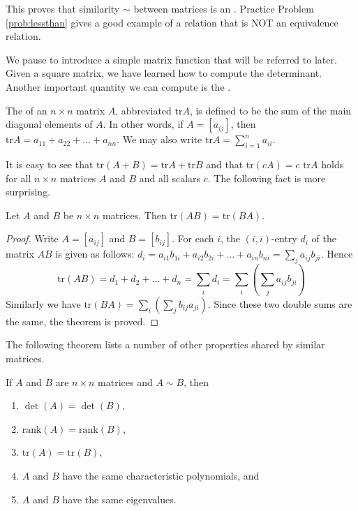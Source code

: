 \documentclass{ximera}
\begin{document}
This proves that similarity $\sim$ between matrices is an .  Practice Problem \ref{prob:lessthan} gives a good example of a relation that is NOT an equivalence relation.


We pause to introduce a simple matrix function that will be referred to later.  Given a square matrix, we have learned how to compute the determinant.  Another important quantity we can compute is the .

\begin{definition}
The  of an $n \times n$ matrix $A$, abbreviated $\mbox{tr} A$, is defined to be the sum of the main diagonal elements of $A$.  In other words, if $ A = [a_{ij}]$, then $\mbox{tr} A = a_{11} + a_{22} + \dots + a_{nn}$.  We may also write $\mbox{tr} A =\sum_{i=1}^n a_{ii}$.
\end{definition}

It is easy to see that $\mbox{tr}(A + B) = \mbox{tr} A + \mbox{tr} B$ and that $\mbox{tr}(cA) = c \mbox{ tr} A$ holds for all $n \times n$ matrices $A$ and $B$ and all scalars $c$. The following fact is more surprising.

\begin{theorem}\label{th:trAB=trBA}
Let $A$ and $B$ be $n \times n$ matrices. Then $\mbox{tr}(AB) = \mbox{tr}(BA)$.
\end{theorem}

\begin{proof}
Write $A = [a_{ij}]$ and $B = [b_{ij}]$. For each $i$, the $(i, i)$-entry $d_{i}$ of the matrix $AB$ is given as follows: $d_{i} = a_{i1}b_{1i} + a_{i2}b_{2i} + \dots + a_{in}b_{ni} = \sum_{j}a_{ij}b_{ji}$. Hence
\begin{equation*}
\mbox{tr}(AB) = d_1 + d_2 + \dots + d_n = \sum_{i}d_i = \sum_{i}\left(\sum_{j}a_{ij}b_{ji}\right)
\end{equation*}
Similarly we have $\mbox{tr}(BA) = \sum_{i}\left(\sum_{j}b_{ij}a_{ji}\right)$. Since these two double sums are the same, the theorem is proved.
\end{proof}

The following theorem lists a number of other properties shared by similar matrices.

\begin{theorem}\label{th:properties_similar}
If $A$ and $B$ are $n\times n$ matrices and $A\sim B$, then
\begin{enumerate}
\item\label{th:properties_similar_det} $\det(A) = \det(B)$,
\item\label{th:properties_similar_rank} $\mbox{rank}(A) = \mbox{rank}(B)$,
\item\label{th:properties_similar_trace} $\mbox{tr}(A)= \mbox{tr}(B)$,
\item\label{th:properties_similar_char_poly} $A$ and $B$ have the same characteristic polynomials, and
\item\label{th:properties_similar_eig} $A$ and $B$ have the same eigenvalues.
\end{enumerate}
\end{theorem}
\end{document}
